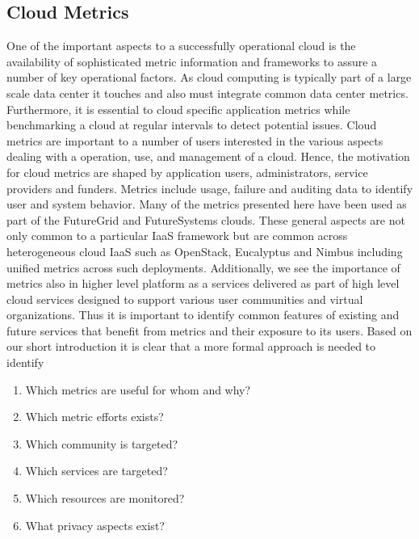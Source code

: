 \documentclass{sig-alternate-05-2015}
\begin{document}





\subsection{Cloud Metrics}

One of the important aspects to a successfully operational cloud is
the availability of sophisticated metric information and frameworks to
assure a number of key operational factors. As cloud computing is
typically part of a large scale data center it touches and also must
integrate common data center metrics. Furthermore, it is essential to
cloud specific application metrics while benchmarking a cloud at
regular intervals to detect potential issues. Cloud metrics are
important to a number of users interested in the various aspects
dealing with a operation, use, and management of a cloud. Hence, the
motivation for cloud metrics are shaped by application users,
administrators, service providers and funders. Metrics include usage,
failure and auditing data to identify user and system behavior. Many
of the metrics presented here have been used as part of the FutureGrid
and FutureSystems clouds. These general aspects are not only common to
a particular IaaS framework but are common across heterogeneous cloud
IaaS such as OpenStack, Eucalyptus and Nimbus including unified
metrics across such deployments.  Additionally, we see the importance
of metrics also in higher level platform as a services delivered as
part of high level cloud services designed to support various user
communities and virtual organizations. Thus it is important to
identify common features of existing and future services that benefit
from metrics and their exposure to its users. Based on our short
introduction it is clear that a more formal approach is needed to
identify

\begin{enumerate}
\setlength\itemsep{-2pt}
\item Which metrics are useful for whom and why?
\item Which metric efforts exists?
\item Which community is targeted?
\item Which services are targeted?
\item Which resources are monitored?
\item What privacy aspects exist? 
\end{enumerate}
\end{document}
